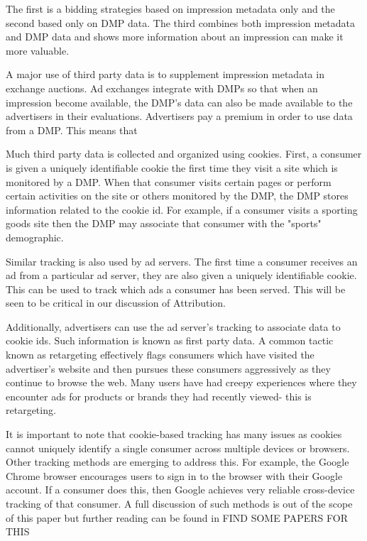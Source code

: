 \documentclass{article}
\begin{document}
The first is a bidding strategies based on impression metadata only and the second based only on DMP data. The third combines both impression metadata and DMP data and shows more information about an impression can make it more valuable. 

A major use of third party data is to supplement impression metadata in exchange auctions. Ad exchanges integrate with DMPs so that when an impression become available, the DMP's data can also be made available to the advertisers in their evaluations. Advertisers pay a premium in order to use data from a DMP. This means that

Much third party data is collected and organized using cookies. First, a consumer is given a uniquely identifiable cookie the first time they visit a site which is monitored by a DMP. When that consumer visits certain pages or perform certain activities on the site or others monitored by the DMP, the DMP stores information related to the cookie id. For example, if a consumer visits a sporting goods site then the DMP may associate that consumer with the "sports" demographic.

Similar tracking is also used by ad servers. The first time a consumer receives an ad from a particular ad server, they are also given a uniquely identifiable cookie. This can be used to track which ads a consumer has been served. This will be seen to be critical in our discussion of Attribution.

Additionally, advertisers can use the ad server's tracking to associate data to cookie ids. Such information is known as first party data. A common tactic known as retargeting effectively flags consumers which have visited the advertiser's website and then pursues these consumers aggressively as they continue to browse the web. Many users have had creepy experiences where they encounter ads for products or brands they had recently viewed- this is retargeting.

It is important to note that cookie-based tracking has many issues as cookies cannot uniquely identify a single consumer across multiple devices or browsers. Other tracking methods are emerging to address this. For example, the Google Chrome browser encourages users to sign in to the browser with their Google account. If a consumer does this, then Google achieves very reliable cross-device tracking of that consumer. A full discussion of such methods is out of the scope of this paper but further reading can be found in FIND SOME PAPERS FOR THIS
\end{document}
